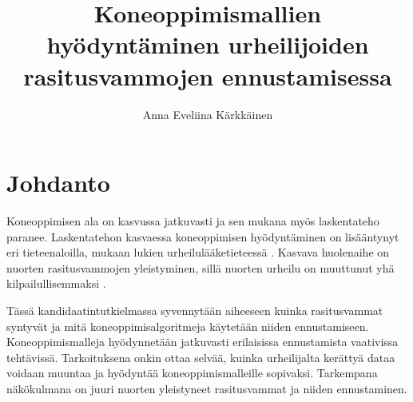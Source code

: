 \documentclass[utf8, bachelor]{gradu3}
\begin{document}
\title{Koneoppimismallien hyödyntäminen urheilijoiden rasitusvammojen ennustamisessa}
\tiivistelma{%

}
\abstract{%

}

\author{Anna Eveliina Kärkkäinen}

\subject{Kandidaatintutkielman}

\subject{Tieto- ja ohjelmistotekniikan}

\maketitle

\bigskip


\mainmatter

\chapter{Johdanto}

Koneoppimisen ala on kasvussa jatkuvasti ja sen mukana myös laskentateho paranee. Laskentatehon kasvaessa koneoppimisen 
hyödyntäminen on lisääntynyt eri tieteenaloilla, mukaan lukien urheilulääketieteessä \parencite{bhatia_exploring_2024}. Kasvava huolenaihe on 
nuorten rasitusvammojen yleistyminen, sillä nuorten urheilu on muuttunut yhä kilpailullisemmaksi \parencite{difiori_overuse_2014}. 

Tässä kandidaatintutkielmassa syvennytään aiheeseen kuinka rasitusvammat syntyvät ja mitä koneoppimisalgoritmeja käytetään niiden ennustamiseen.
Koneoppimismalleja hyödynnetään jatkuvasti erilaisissa ennustamista vaativissa tehtävissä. Tarkoituksena onkin ottaa selvää, kuinka urheilijalta 
kerättyä dataa voidaan muuntaa ja hyödyntää koneoppimismalleille sopivaksi. Tarkempana näkökulmana on juuri nuorten yleistyneet rasitusvammat ja niiden ennustaminen.
\end{document}

